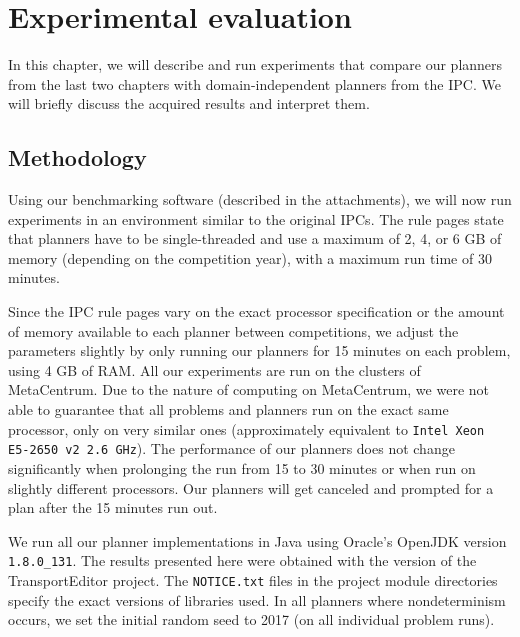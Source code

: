 \chapter{Experimental evaluation}\label{experiments}

In this chapter, we will describe and run experiments
that compare our planners from the last two chapters
with domain-independent planners from the IPC.
We will briefly discuss the acquired results and interpret them.

\section{Methodology}

Using our benchmarking software (described in the attachments), we will now run experiments in an
environment similar to the original
IPCs. The rule pages state that
planners have to be single-threaded and use a maximum of 2, 4, or 6 GB of memory (depending on the competition year), with a maximum run time of 30 minutes.

Since the IPC rule pages vary on the exact processor specification or the amount of memory available to each planner between competitions,
we adjust the parameters slightly by only running our planners
for 15 minutes on each problem, using 4 GB of RAM.
All our experiments are run on
the clusters of MetaCentrum.
Due to the nature of computing on MetaCentrum, we were not able to guarantee that all problems and planners
run on the exact same processor, only on very similar ones
(approximately equivalent to \texttt{Intel Xeon E5-2650 v2 2.6 GHz}).
The performance of our planners does not change significantly
when prolonging the run from 15 to 30 minutes or when run
on slightly different processors.
Our planners will get canceled and prompted for a plan after the 15 minutes run out. 

We run all our planner implementations in Java using Oracle's OpenJDK 
version \texttt{1.8.0\_131}.
The results presented here were obtained with the \TEver{} version of the TransportEditor project. The \texttt{NOTICE.txt} files
in the project module directories specify
the exact versions of libraries used.
In all planners where nondeterminism occurs,
we set the initial random seed to 2017
(on all individual problem runs).

